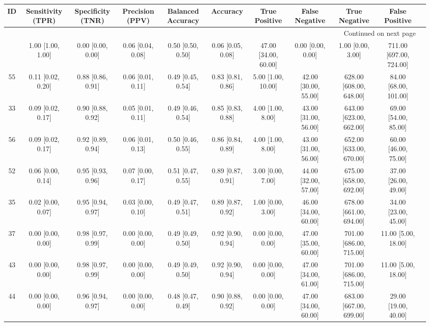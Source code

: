 \documentclass[8pt]{article}
\begin{document}
\begin{center}
\begin{footnotesize}
\begin{longtable}{|ccccccccccc|}
\toprule
 ID &  Sensitivity (TPR) &  Specificity (TNR) &    Precision (PPV) &  Balanced Accuracy &           Accuracy &         True Positive &        False Negative &            True Negative &           False Positive \\
\midrule
\endhead
\midrule
\multicolumn{10}{r}{{Continued on next page}} \\
\midrule
\endfoot

\bottomrule
\endlastfoot
 38 &  1.00 [1.00, 1.00] &  0.00 [0.00, 0.00] &  0.06 [0.04, 0.08] &  0.50 [0.50, 0.50] &  0.06 [0.05, 0.08] &  47.00 [34.00, 60.00] &     0.00 [0.00, 0.00] &        1.00 [0.00, 3.00] &  711.00 [697.00, 724.00] \\
 55 &  0.11 [0.02, 0.20] &  0.88 [0.86, 0.91] &  0.06 [0.01, 0.11] &  0.49 [0.45, 0.54] &  0.83 [0.81, 0.86] &    5.00 [1.00, 10.00] &  42.00 [30.00, 55.00] &  628.00 [608.00, 648.00] &    84.00 [68.00, 101.00] \\
 33 &  0.09 [0.02, 0.17] &  0.90 [0.88, 0.92] &  0.05 [0.01, 0.11] &  0.49 [0.46, 0.54] &  0.85 [0.83, 0.88] &     4.00 [1.00, 8.00] &  43.00 [31.00, 56.00] &  643.00 [623.00, 662.00] &     69.00 [54.00, 85.00] \\
 56 &  0.09 [0.02, 0.17] &  0.92 [0.89, 0.94] &  0.06 [0.01, 0.13] &  0.50 [0.46, 0.55] &  0.86 [0.84, 0.89] &     4.00 [1.00, 8.00] &  43.00 [31.00, 56.00] &  652.00 [633.00, 670.00] &     60.00 [46.00, 75.00] \\
 52 &  0.06 [0.00, 0.14] &  0.95 [0.93, 0.96] &  0.07 [0.00, 0.17] &  0.51 [0.47, 0.55] &  0.89 [0.87, 0.91] &     3.00 [0.00, 7.00] &  44.00 [32.00, 57.00] &  675.00 [658.00, 692.00] &     37.00 [26.00, 49.00] \\
 35 &  0.02 [0.00, 0.07] &  0.95 [0.94, 0.97] &  0.03 [0.00, 0.10] &  0.49 [0.47, 0.51] &  0.89 [0.87, 0.92] &     1.00 [0.00, 3.00] &  46.00 [34.00, 60.00] &  678.00 [661.00, 694.00] &     34.00 [23.00, 45.00] \\
 37 &  0.00 [0.00, 0.00] &  0.98 [0.97, 0.99] &  0.00 [0.00, 0.00] &  0.49 [0.49, 0.50] &  0.92 [0.90, 0.94] &     0.00 [0.00, 0.00] &  47.00 [35.00, 60.00] &  701.00 [686.00, 715.00] &      11.00 [5.00, 18.00] \\
 43 &  0.00 [0.00, 0.00] &  0.98 [0.97, 0.99] &  0.00 [0.00, 0.00] &  0.49 [0.49, 0.50] &  0.92 [0.90, 0.94] &     0.00 [0.00, 0.00] &  47.00 [34.00, 61.00] &  701.00 [686.00, 715.00] &      11.00 [5.00, 18.00] \\
 44 &  0.00 [0.00, 0.00] &  0.96 [0.94, 0.97] &  0.00 [0.00, 0.00] &  0.48 [0.47, 0.49] &  0.90 [0.88, 0.92] &     0.00 [0.00, 0.00] &  47.00 [34.00, 60.00] &  683.00 [667.00, 699.00] &     29.00 [19.00, 40.00] \\
\end{longtable}
\end{footnotesize}
\end{center}
\end{document}
